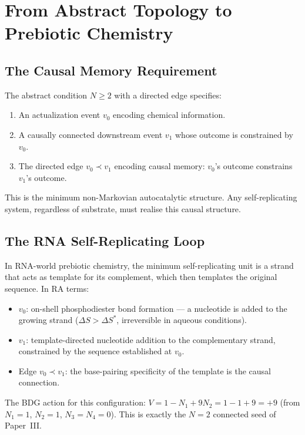 \documentclass[12pt,a4paper]{article}
\begin{document}
\section{From Abstract Topology to Prebiotic Chemistry}\label{sec:rna}

\subsection{The Causal Memory Requirement}

The abstract condition $N\geq2$ with a directed edge specifies:
\begin{enumerate}
  \item An actualization event $v_0$ encoding chemical information.
  \item A causally connected downstream event $v_1$ whose outcome is constrained by $v_0$.
  \item The directed edge $v_0\prec v_1$ encoding causal memory: $v_0$'s outcome constrains $v_1$'s outcome.
\end{enumerate}
This is the minimum non-Markovian autocatalytic structure.  Any self-replicating system, regardless of substrate, must realise this causal structure.

\subsection{The RNA Self-Replicating Loop}

In RNA-world prebiotic chemistry, the minimum self-replicating unit is a strand that acts as template for its complement, which then templates the original sequence.  In RA terms:

\begin{itemize}
  \item $v_0$: on-shell phosphodiester bond formation --- a nucleotide is added to the growing strand ($\Delta S>\Delta S^*$, irreversible in aqueous conditions).
  \item $v_1$: template-directed nucleotide addition to the complementary strand, constrained by the sequence established at $v_0$.
  \item Edge $v_0\prec v_1$: the base-pairing specificity of the template is the causal connection.
\end{itemize}

The BDG action for this configuration: $V=1-N_1+9N_2=1-1+9=+9$ (from $N_1=1$, $N_2=1$, $N_3=N_4=0$).  This is exactly the $N=2$ connected seed of Paper~III.
\end{document}
